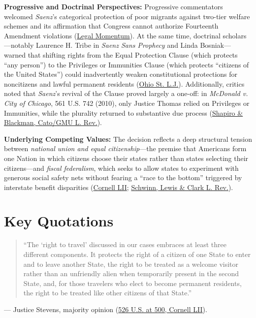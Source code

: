 \documentclass[12pt]{article}
\begin{document}
\textbf{Progressive and Doctrinal Perspectives:} Progressive commentators welcomed \textit{Saenz}'s categorical protection of poor migrants against two-tier welfare schemes and its affirmation that Congress cannot authorize Fourteenth Amendment violations (\href{https://www.legalmomentum.org/library/saenz-v-roe}{Legal Momentum}). At the same time, doctrinal scholars---notably Laurence H. Tribe in \textit{Saenz Sans Prophecy} and Linda Bosniak---warned that shifting rights from the Equal Protection Clause (which protects ``any person'') to the Privileges or Immunities Clause (which protects ``citizens of the United States'') could inadvertently weaken constitutional protections for noncitizens and lawful permanent residents (\href{https://kb.osu.edu/bitstream/handle/1811/70511/OSLJ_V63N5_1285.pdf}{Ohio St. L.J.}). Additionally, critics noted that \textit{Saenz}'s revival of the Clause proved largely a one-off: in \textit{McDonald v. City of Chicago}, 561 U.S. 742 (2010), only Justice Thomas relied on Privileges or Immunities, while the plurality returned to substantive due process (\href{https://www.cato.org/sites/cato.org/files/2020-04/shapiro-blackman-gmlr-priv-imm-clause.pdf}{Shapiro \& Blackman, Cato/GMU L. Rev.}).

\textbf{Underlying Competing Values:} The decision reflects a deep structural tension between \emph{national union and equal citizenship}---the premise that Americans form one Nation in which citizens choose their states rather than states selecting their citizens---and \emph{fiscal federalism}, which seeks to allow states to experiment with generous social safety nets without fearing a ``race to the bottom'' triggered by interstate benefit disparities (\href{https://www.law.cornell.edu/supremecourt/text/98-97}{Cornell LII}; \href{https://law.lclark.edu/live/files/9702-schwinnpdf}{Schwinn, Lewis \& Clark L. Rev.}).

\section{Key Quotations}

\begin{quote}
``The `right to travel' discussed in our cases embraces at least three different components. It protects the right of a citizen of one State to enter and to leave another State, the right to be treated as a welcome visitor rather than an unfriendly alien when temporarily present in the second State, and, for those travelers who elect to become permanent residents, the right to be treated like other citizens of that State.''
\end{quote}
\noindent --- Justice Stevens, majority opinion (\href{https://www.law.cornell.edu/supremecourt/text/98-97}{526 U.S. at 500, Cornell LII}).
\end{document}
